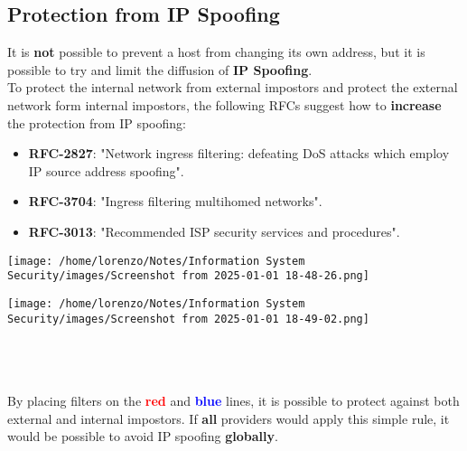\subsection{Protection from IP Spoofing}
It is \textbf{not} possible to prevent a host from changing its own address, but it is possible to try and limit the diffusion of \textbf{IP Spoofing}.\\
To protect the internal network from external impostors and protect the external network form internal impostors, the following RFCs suggest how to \textbf{increase} the protection from IP
spoofing:
\begin{itemize}
    \item \textbf{RFC-2827}: "Network ingress filtering: defeating DoS attacks which employ IP source
    address spoofing".
    \item \textbf{RFC-3704}: "Ingress filtering multihomed networks".
    \item \textbf{RFC-3013}: "Recommended ISP security services and procedures".
\end{itemize}
\begin{minipage}{0.5\textwidth}    
        \centering
        \texttt{[image: /home/lorenzo/Notes/Information System Security/images/Screenshot from 2025-01-01 18-48-26.png]}       
\end{minipage} 
\hspace{0.5cm}
\begin{minipage}{0.5\textwidth}   
        \centering
        \texttt{[image: /home/lorenzo/Notes/Information System Security/images/Screenshot from 2025-01-01 18-49-02.png]}
\end{minipage}
\\   \\    \\
By placing filters on the \textcolor{red}{\textbf{red}} and \textcolor{blue}{\textbf{blue}} lines, it is possible to protect against both external and internal impostors. If \textbf{all} providers would apply this simple rule, it would be possible to avoid IP spoofing \textbf{globally}.